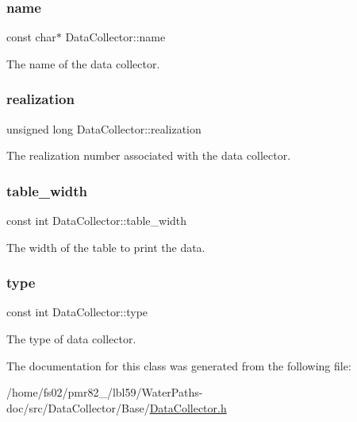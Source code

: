 \subsubsection{\texorpdfstring{name}{name}}
{\footnotesize\ttfamily const char$\ast$ Data\+Collector\+::name}



The name of the data collector. 

\mbox{\label{classDataCollector_a9ef2887466fe3123aa19ef956a219b96}} 
\subsubsection{\texorpdfstring{realization}{realization}}
{\footnotesize\ttfamily unsigned long Data\+Collector\+::realization}



The realization number associated with the data collector. 

\mbox{\label{classDataCollector_af46c27a47de92d92dcdae6b26a905a44}} 
\subsubsection{\texorpdfstring{table\+\_\+width}{table\_width}}
{\footnotesize\ttfamily const int Data\+Collector\+::table\+\_\+width}



The width of the table to print the data. 

\mbox{\label{classDataCollector_acad1c22d67a8eb3db056ba776a131900}} 
\subsubsection{\texorpdfstring{type}{type}}
{\footnotesize\ttfamily const int Data\+Collector\+::type}



The type of data collector. 



The documentation for this class was generated from the following file\+:\begin{DoxyCompactItemize}
\item 
/home/fs02/pmr82\+\_/lbl59/\+Water\+Paths-\/doc/src/\+Data\+Collector/\+Base/\mbox{\hyperlink{DataCollector_8h}{Data\+Collector.\+h}}\end{DoxyCompactItemize}

